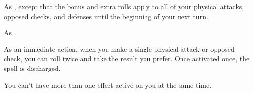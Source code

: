 \begin{spellheader}
    \begin{spelltargetinginfo}
    \end{spelltargetinginfo}
\end{spellheader}
\begin{spellcontent}
    \begin{spelleffects}
        \spelleffect As , except that the bonus and extra rolls apply to all of your physical attacks, opposed checks, and defenses until the beginning of your next turn.
    \end{spelleffects}
\end{spellcontent}
\begin{spellfooter}
    \spellnotes As .
\end{spellfooter}

\begin{spellheader}
    \begin{spelltargetinginfo}
    \end{spelltargetinginfo}
\end{spellheader}
\begin{spellcontent}
    \begin{spelleffects}
        \spelleffect As an immediate action, when you make a single physical attack or opposed check, you can roll twice and take the result you prefer. Once activated once, the spell is discharged.
    \end{spelleffects}
\end{spellcontent}
\begin{spellfooter}
    \spellnotes You can't have more than one  effect active on you at the same time.
\end{spellfooter}

\begin{comment}
\subsubsection{O-P}
\end{comment}

